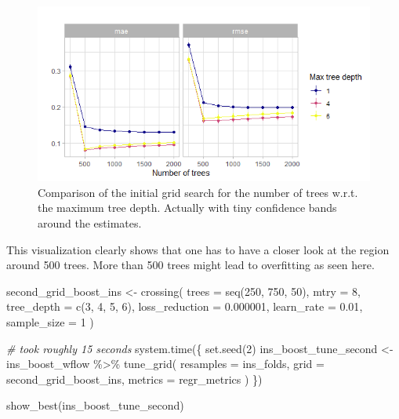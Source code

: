\documentclass[
]{book}
\newenvironment{Shaded}{\begin{snugshade}}{\end{snugshade}}
\newcommand{\AttributeTok}[1]{\textcolor[rgb]{0.77,0.63,0.00}{#1}}
\newcommand{\CommentTok}[1]{\textcolor[rgb]{0.56,0.35,0.01}{\textit{#1}}}
\newcommand{\DecValTok}[1]{\textcolor[rgb]{0.00,0.00,0.81}{#1}}
\newcommand{\FloatTok}[1]{\textcolor[rgb]{0.00,0.00,0.81}{#1}}
\newcommand{\FunctionTok}[1]{\textcolor[rgb]{0.00,0.00,0.00}{#1}}
\newcommand{\NormalTok}[1]{#1}
\newcommand{\OtherTok}[1]{\textcolor[rgb]{0.56,0.35,0.01}{#1}}
\newcommand{\SpecialCharTok}[1]{\textcolor[rgb]{0.00,0.00,0.00}{#1}}
\begin{document}
\begin{figure}

{\centering \includegraphics[width=0.7\linewidth]{_pictures/boost_ins_tune_plot1} 

}

\caption{Comparison of the initial grid search for the number of trees w.r.t. the maximum tree depth. Actually with tiny confidence bands around the estimates.}\label{fig:boostInstuneplot1}
\end{figure}

This visualization clearly shows that one has to have a closer look at the region around 500 trees. More than 500 trees might lead to overfitting as seen here.

\begin{Shaded}
\begin{Highlighting}[]
\NormalTok{second\_grid\_boost\_ins }\OtherTok{\textless{}{-}} \FunctionTok{crossing}\NormalTok{(}
  \AttributeTok{trees =} \FunctionTok{seq}\NormalTok{(}\DecValTok{250}\NormalTok{, }\DecValTok{750}\NormalTok{, }\DecValTok{50}\NormalTok{),}
  \AttributeTok{mtry =} \DecValTok{8}\NormalTok{,}
  \AttributeTok{tree\_depth =} \FunctionTok{c}\NormalTok{(}\DecValTok{3}\NormalTok{, }\DecValTok{4}\NormalTok{, }\DecValTok{5}\NormalTok{, }\DecValTok{6}\NormalTok{),}
  \AttributeTok{loss\_reduction =} \FloatTok{0.000001}\NormalTok{,}
  \AttributeTok{learn\_rate =} \FloatTok{0.01}\NormalTok{,}
  \AttributeTok{sample\_size =} \DecValTok{1}
\NormalTok{)}
\end{Highlighting}
\end{Shaded}

\begin{Shaded}
\begin{Highlighting}[]
\CommentTok{\# took roughly 15 seconds}
\FunctionTok{system.time}\NormalTok{(\{}
  \FunctionTok{set.seed}\NormalTok{(}\DecValTok{2}\NormalTok{)}
\NormalTok{  ins\_boost\_tune\_second }\OtherTok{\textless{}{-}}\NormalTok{ ins\_boost\_wflow }\SpecialCharTok{\%\textgreater{}\%}
    \FunctionTok{tune\_grid}\NormalTok{(}
      \AttributeTok{resamples =}\NormalTok{  ins\_folds,}
      \AttributeTok{grid =}\NormalTok{ second\_grid\_boost\_ins,}
      \AttributeTok{metrics =}\NormalTok{ regr\_metrics}
\NormalTok{    )}
\NormalTok{\})}


\FunctionTok{show\_best}\NormalTok{(ins\_boost\_tune\_second)}
\end{Highlighting}
\end{Shaded}
\end{document}

